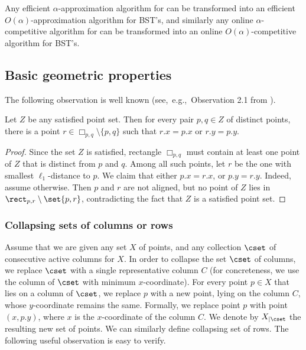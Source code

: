 %
\begin{theorem}[Demaine et al.]    %
Any efficient $\alpha$-approximation algorithm for \minsat can be transformed into an efficient $O(\alpha)$-approximation algorithm for BST's, and similarly any online $\alpha$-competitive algorithm for \minsat can be transformed into an online $O(\alpha)$-competitive algorithm for BST's. 
\end{theorem} 

%






	\subsection{Basic geometric properties }

	The following observation is well known (see,~e.g.,~Observation 2.1 from \cite{DHIKP09}). 
\begin{myobs}
        \label{obs: aligned point} 
        Let $Z$ be  any satisfied point set. Then for every pair $p,q \in Z$ of distinct points, there is a point $r \in \Box_{p,q} \setminus \{p,q\}$ such that $r.x = p.x$ or $r.y = p.y$. 
\end{myobs}
\begin{proof}
Since the set $Z$ is satisfied, rectangle $\Box_{p,q} $ must contain at least one point of $Z$ that is distinct from $p$ and $q$. Among all such points, let $r$ be the one with smallest $\ell_1$-distance to $p$. We claim that either $p.x=r.x$, or $p.y=r.y$. Indeed, assume otherwise. Then $p$ and $r$ are not aligned, but no point of $Z$ lies in $\rect_{p,r}\setminus\set{p,r}$, contradicting the fact that $Z$ is a satisfied point set.
\end{proof}



\subsubsection{Collapsing sets of columns or rows}
Assume that we are given any set $X$ of points, and any collection $\cset$ of consecutive active columns for $X$. 
In order to collapse the set $\cset$ of columns, we replace $\cset$ with a single representative column $C$ (for concreteness, we use the column of $\cset$ with minimum $x$-coordinate). 
For every point $p\in X$ that lies on a column of $\cset$, we replace $p$ with a new point, lying on the column $C$, whose $y$-coordinate remains the same.
Formally, we replace point $p$ with point $(x, p.y)$, where $x$ is the $x$-coordinate of the column $C$.  
We denote by $X_{|\cset}$ the resulting new set of points. We can similarly define collapsing set of rows. The following useful observation is easy to verify.%

